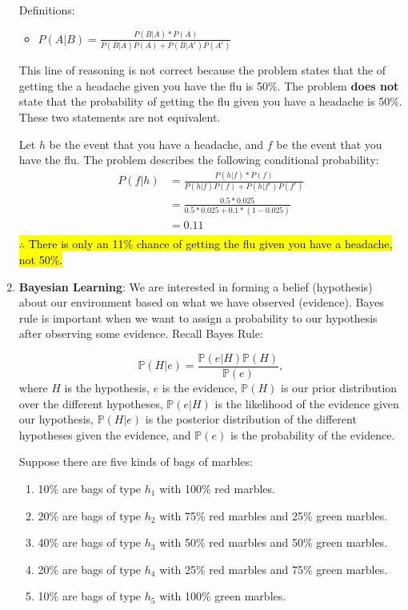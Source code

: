 \documentclass[11pt,onecolumn]{article}
\begin{document}
\begin{enumerate}
    Definitions:
    \begin{itemize}
        \item $P(A \vert B) = \frac{P(B \vert A)*P(A)}{P(B \vert A)P(A) + P(B \vert A^c)P(A^c)}$
    \end{itemize}

    This line of reasoning is not correct because the problem states that the of getting the a headache given you have the flu is 50\%. The problem \textbf{does not} state that the probability of getting the flu given you have a headache is 50\%. These two statements are not equivalent.

    Let $h$ be the event that you have a headache, and $f$ be the event that you have the flu. The problem describes the following conditional probability:
    \begin{equation}
        \begin{aligned}
        P(f \vert h) & =  \frac{P(h \vert f)*P(f)}{P(h \vert f)P(f) + P(h \vert f^c)P(f^c)} \\
        & =  \frac{0.5*0.025}{0.5*0.025 + 0.1*(1-0.025)} \\ 
        & =  0.11 \\ 
    \end{aligned}
    \end{equation}
    \hl{$\therefore$ There is only an 11\% chance of getting the flu given you have a headache, not 50\%.}

    \item \textbf{Bayesian Learning}: We are interested in forming a belief (hypothesis) about our environment based on what we have observed (evidence). Bayes rule is important when we want to assign a probability to our hypothesis after observing some evidence. Recall Bayes Rule:
    
    \begin{equation*}
        \mathbb{P}(H|e) = \frac{\mathbb{P}(e|H) \mathbb{P}(H)}{\mathbb{P}(e)},
    \end{equation*}
    where $H$ is the hypothesis, $e$ is the evidence, $\mathbb{P}(H)$ is our prior distribution over the different hypotheses, $\mathbb{P}(e|H)$ is the likelihood of the evidence given our hypothesis, $\mathbb{P}(H|e)$ is the posterior distribution of the different hypotheses given the evidence, and $\mathbb{P}(e)$ is the probability of the evidence.
    
    Suppose there are five kinds of bags of marbles: 
    \begin{enumerate}
        \item 10\% are bags of type $h_1$ with 100\% red marbles.
        \item 20\% are bags of type $h_2$ with 75\% red marbles and 25\% green marbles.
        \item 40\% are bags of type $h_3$ with 50\% red marbles and 50\% green marbles.
        \item 20\% are bags of type $h_4$ with 25\% red marbles and 75\% green marbles.
        \item 10\% are bags of type $h_5$ with 100\% green marbles.
    \end{enumerate}
    

\end{enumerate}
\end{document}
